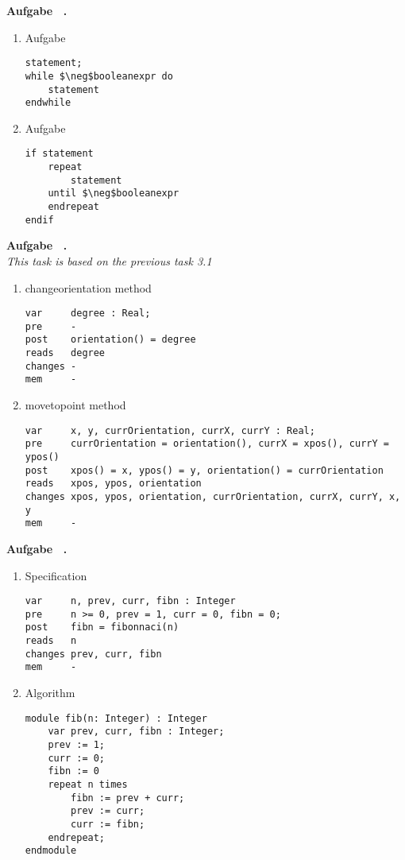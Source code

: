 \documentclass[a4paper,11pt]{article}             %
\def\vblatt{~}
\newcommand{\lstalg}{\lstset { numbers=left,language=alglang,tabsize=2,numberstyle=\tiny,style=algstyle}}
\newcounter{aufgabe}
\newcommand{\Aufgabe}{\noindent\newline\addtocounter{aufgabe}{1}\textbf{Aufgabe \vblatt.\theaufgabe}\\
}
\begin{document}
\Aufgabe
\begin{enumerate}

\item Aufgabe
\lstalg
\begin{lstlisting}
statement;
while $\neg$booleanexpr do
    statement
endwhile
\end{lstlisting}

\item Aufgabe
\lstalg
\begin{lstlisting}
if statement
    repeat
        statement
    until $\neg$booleanexpr
    endrepeat
endif
\end{lstlisting}

\end{enumerate}

\Aufgabe
\textit{This task is based on the previous task 3.1}
\\
\begin{enumerate}
\item changeorientation method
\lstalg
\begin{lstlisting}
var     degree : Real;
pre     -
post    orientation() = degree
reads   degree
changes -
mem     - 
\end{lstlisting}

\item movetopoint method
\lstalg
\begin{lstlisting}
var     x, y, currOrientation, currX, currY : Real;
pre     currOrientation = orientation(), currX = xpos(), currY = ypos()
post    xpos() = x, ypos() = y, orientation() = currOrientation
reads   xpos, ypos, orientation
changes xpos, ypos, orientation, currOrientation, currX, currY, x, y
mem     -
\end{lstlisting}

\end{enumerate}

\newpage

\Aufgabe
\begin{enumerate}
\item Specification
\lstalg
\begin{lstlisting}
var		n, prev, curr, fibn : Integer
pre 	n >= 0, prev = 1, curr = 0, fibn = 0;
post 	fibn = fibonnaci(n)
reads 	n
changes	prev, curr, fibn
mem 	-
\end{lstlisting}
\item Algorithm
\lstalg
\begin{lstlisting}
module fib(n: Integer) : Integer
	var prev, curr, fibn : Integer;
	prev := 1;
	curr := 0;
	fibn := 0
	repeat n times
		fibn := prev + curr;
		prev := curr;
		curr := fibn;
	endrepeat;
endmodule
\end{lstlisting}
\end{enumerate}
\end{document}
